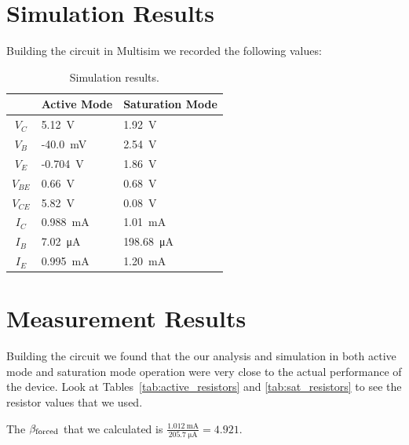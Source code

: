 \documentclass{../../ece-report}
\begin{document}
\section*{Simulation Results}

Building the circuit in Multisim we recorded the following values:


\begin{table}[h!]
  \centering
  \begin{tabular}{c l l}\toprule
      & \textbf{Active Mode} & \textbf{Saturation Mode} \\
    \midrule
    $V_C$     & 5.12~\si{\V}   &  1.92~\si{\V}  \\
    $V_B$     & -40.0~\si{\mV} &  2.54~\si{\V}  \\
    $V_E$     & -0.704~\si{\V} &  1.86~\si{\V}  \\
\midrule
    $V_{BE}$  & 0.66~\si{\V}  &  0.68~\si{\V}   \\
    $V_{CE}$  & 5.82~\si{\V}  &  0.08~\si{\V}   \\
    $I_C$     & 0.988~\si{\mA} &  1.01~\si{\mA}\\
    $I_B$     & 7.02~\si{\uA}  &  198.68~\si{\uA} \\
    $I_E$     & 0.995~\si{\mA} &  1.20~\si{\mA}\\
\bottomrule
\end{tabular}
\caption{Simulation results.}
\label{tab:sim_results}
\end{table}



\section*{Measurement Results}

Building the circuit we found that the our analysis
and simulation in both active mode and saturation mode
operation were very close to the actual performance
of the device. Look at Tables~\ref{tab:active_resistors}
and \ref{tab:sat_resistors} to see the resistor values
that we used.

The $\beta_\textnormal{forced}$ that we calculated is
$\frac{1.012~\si\mA}{205.7~\si\uA} = 4.921$.
\end{document}
